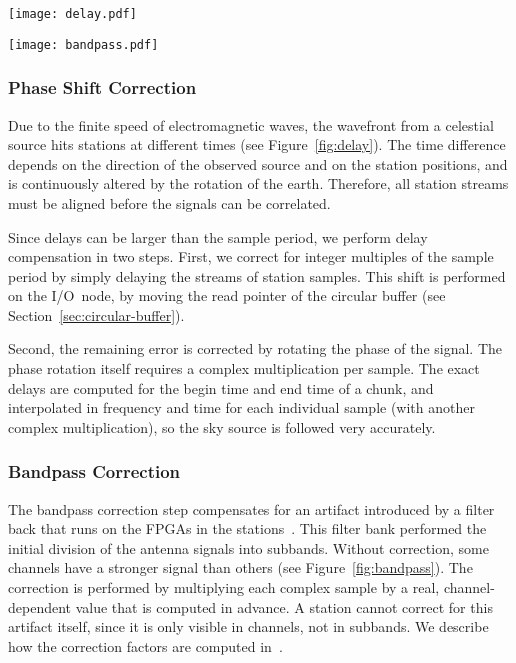 \begin{figure*}
\begin{minipage}[b]{55mm}
\begin{center}
\texttt{[image: delay.pdf]}
\end{center}
\caption{The left antenna receives the wave later.}
\label{fig:delay}
\end{minipage}
\hfill
\begin{minipage}[b]{55mm}
\begin{center}
\texttt{[image: bandpass.pdf]}
\end{center}
\caption{Channels have different signal powers.}
\label{fig:bandpass}
\end{minipage}
\end{figure*}


\subsubsection{Phase Shift Correction}
\label{sec:delay-compensation}

Due to the finite speed of electromagnetic waves, the wavefront from a
celestial source hits stations at different times
(see Figure~\ref{fig:delay}).
The time difference depends on the direction of the observed source and on the
station positions, and is continuously altered by the rotation of the earth.
Therefore, all station streams must be aligned before the signals can be
correlated.

Since delays can be larger than the sample period, we perform delay
compensation in two steps.
First, we correct for integer multiples of the sample period by simply
delaying the streams of station samples.
This shift is performed on the I/O~node, by moving the read pointer of the
circular buffer (see Section~\ref{sec:circular-buffer}).

Second, the remaining error is corrected by rotating the phase of the signal.
The phase rotation itself requires a complex multiplication per sample.
The exact delays are computed for the begin time and end time of a chunk,
and interpolated in frequency and time for each individual sample (with
another complex multiplication), so the sky source is followed very accurately.


\subsubsection{Bandpass Correction}

The bandpass correction step compensates for an artifact introduced by a
filter back that runs on the FPGAs in the stations~\cite{Kooistra:10}.
This filter bank performed the initial division of the antenna signals into
subbands.
Without correction, some channels have a stronger signal than others
(see Figure~\ref{fig:bandpass}).
The correction is performed by multiplying each complex sample by a real,
channel-dependent value that is computed in advance.
A station cannot correct for this artifact itself, since it is only visible
in channels, not in subbands.
We describe how the correction factors are computed in~\cite{Romein:08}.


